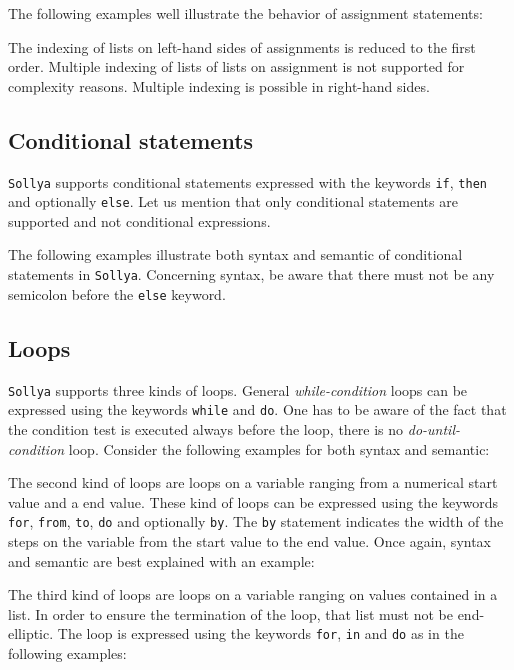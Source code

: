\documentclass[a4paper]{article}
\newcommand{\key}[1]{\texttt{#1}}
\newcommand{\sollya}{\texttt{Sollya}\xspace}
\begin{document}
The following examples well illustrate the behavior of assignment
statements:




The indexing of lists on left-hand sides of assignments is reduced to
the first order. Multiple indexing of lists of lists on assignment is
not supported for complexity reasons. Multiple indexing is possible in
right-hand sides.



\subsection{Conditional statements}

\sollya supports conditional statements expressed with the keywords
\key{if}, \key{then} and optionally \key{else}. Let us mention that only
conditional statements are supported and not conditional expressions. 

The following examples illustrate both syntax and semantic of
conditional statements in \sollya. Concerning syntax, be aware that there must not be any semicolon
before the \key{else} keyword.



\subsection{Loops}

\sollya supports three kinds of loops. General \emph{while-condition}
loops can be expressed using the keywords \key{while} and
\key{do}. One has to be aware of the fact that the condition test is
executed always before the loop, there is no \emph{do-until-condition}
loop. Consider the following examples for both syntax and semantic:



The second kind of loops are loops on a variable ranging from a
numerical start value and a end value. These kind of loops can be
expressed using the keywords \key{for}, \key{from}, \key{to}, \key{do}
and optionally \key{by}. The \key{by} statement indicates the width of
the steps on the variable from the start value to the end value. Once
again, syntax and semantic are best explained with an example:



The third kind of loops are loops on a variable ranging on values
contained in a list. In order to ensure the termination of the loop,
that list must not be end-elliptic. The loop is expressed using the
keywords \key{for}, \key{in} and \key{do} as in the following
examples:
\end{document}
